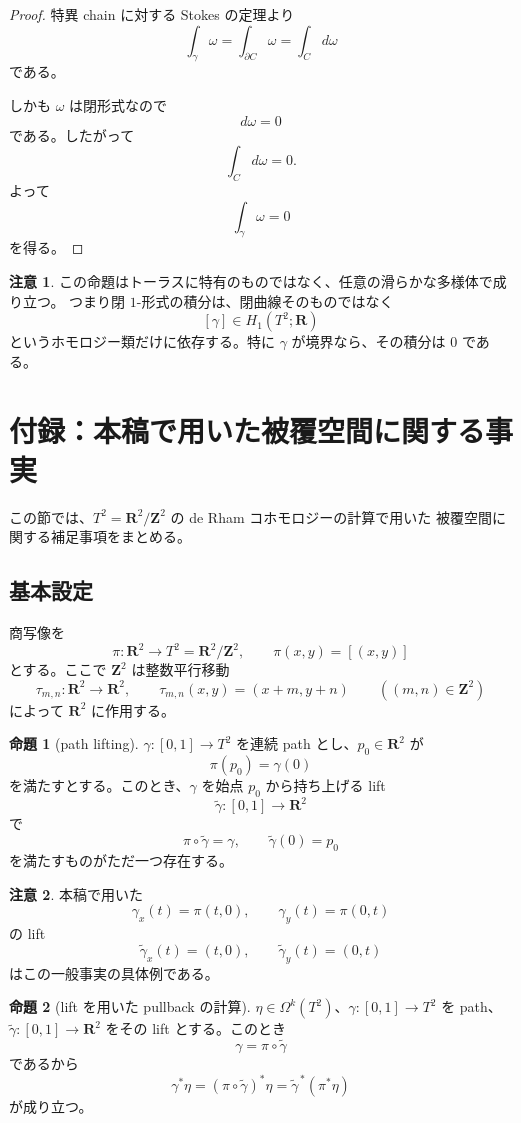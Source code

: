 \documentclass[uplatex,dvipdfmx,11pt]{jsarticle}
\newcommand{\R}{\mathbf{R}}
\newcommand{\Z}{\mathbf{Z}}
\theoremstyle{definition}
\newtheorem{prop}{命題}
\newtheorem{remark}{注意}
\begin{document}
\begin{proof}
特異 chain に対する Stokes の定理より
\[
\int_\gamma \omega
=
\int_{\partial C}\omega
=
\int_C d\omega
\]
である。

しかも \(\omega\) は閉形式なので
\[
d\omega=0
\]
である。したがって
\[
\int_C d\omega
=
0.
\]
よって
\[
\int_\gamma \omega=0
\]
を得る。
\end{proof}

\begin{remark}
この命題はトーラスに特有のものではなく、任意の滑らかな多様体で成り立つ。
つまり閉 \(1\)-形式の積分は、閉曲線そのものではなく
\[
[\gamma]\in H_1(T^2;\R)
\]
というホモロジー類だけに依存する。特に \(\gamma\) が境界なら、その積分は \(0\) である。
\end{remark}

\section*{付録：本稿で用いた被覆空間に関する事実}

この節では、\(T^2=\R^2/\Z^2\) の de Rham コホモロジーの計算で用いた
被覆空間に関する補足事項をまとめる。

\subsection*{基本設定}

商写像を
\[
\pi:\R^2\to T^2=\R^2/\Z^2,\qquad \pi(x,y)=[(x,y)]
\]
とする。ここで \(\Z^2\) は整数平行移動
\[
\tau_{m,n}:\R^2\to\R^2,\qquad \tau_{m,n}(x,y)=(x+m,y+n)
\qquad ((m,n)\in\Z^2)
\]
によって \(\R^2\) に作用する。

\begin{prop}[path lifting]
\(\gamma:[0,1]\to T^2\) を連続 path とし、\(p_0\in\R^2\) が
\[
\pi(p_0)=\gamma(0)
\]
を満たすとする。このとき、\(\gamma\) を始点 \(p_0\) から持ち上げる lift
\[
\widetilde{\gamma}:[0,1]\to\R^2
\]
で
\[
\pi\circ\widetilde{\gamma}=\gamma,\qquad \widetilde{\gamma}(0)=p_0
\]
を満たすものがただ一つ存在する。
\end{prop}

\begin{remark}
本稿で用いた
\[
\gamma_x(t)=\pi(t,0),\qquad \gamma_y(t)=\pi(0,t)
\]
の lift
\[
\widetilde{\gamma}_x(t)=(t,0),\qquad \widetilde{\gamma}_y(t)=(0,t)
\]
はこの一般事実の具体例である。
\end{remark}

\begin{prop}[lift を用いた pullback の計算]
\(\eta\in\Omega^k(T^2)\)、\(\gamma:[0,1]\to T^2\) を path、
\(\widetilde{\gamma}:[0,1]\to\R^2\) をその lift とする。このとき
\[
\gamma=\pi\circ\widetilde{\gamma}
\]
であるから
\[
\gamma^*\eta
=
(\pi\circ\widetilde{\gamma})^*\eta
=
\widetilde{\gamma}^{\,*}(\pi^*\eta)
\]
が成り立つ。
\end{prop}
\end{document}
